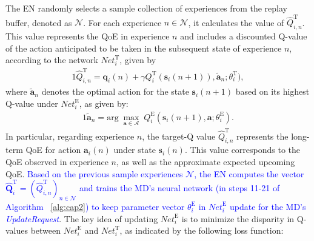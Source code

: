 \documentclass[10pt, journal,letterpaper]{IEEEtran}
\begin{document}
The EN randomly selects a sample collection of experiences from the replay buffer, denoted as $\mathcal{N}$. For each experience $n \in \mathcal{N}$, it calculates the value of $	\hat{Q}^{\text{T}}_{i,n}$. This value represents the QoE in experience $n$ and includes a discounted Q-value of the action anticipated to be taken in the subsequent state of experience $n$, according to the network $\textit{Net}^\text{T}_i$, given by
\begin{alignat}{1}
	\hat{Q}_{i,n}^{\text{T}} = \boldsymbol{q}_i(n) + \gamma Q_i^{\text{T}}(\boldsymbol{s}_i(n+1)), \tilde{\boldsymbol{a}}_n; \theta_i^{\text{T}}),
	\label{28}  
\end{alignat}  
where $\tilde{\boldsymbol{a}}_n$ denotes the optimal action for the state $\boldsymbol{s}_i(n+1)$ based on its highest Q-value under $\textit{Net}_i^{\text{E}}$, as given by:
\begin{alignat}{1}
	\tilde{\boldsymbol{a}}_n = \text{arg} \; \max_{\boldsymbol{a} \in \mathcal{A}} \; Q_i^{\text{E}}(\boldsymbol{s}_i(n+1), \boldsymbol{a}; \theta_i^{\text{E}}).
	\label{29}  
\end{alignat} 
In particular, regarding experience $n$, the target-Q value $\hat{Q}_{i,n}^{\text{T}}$ represents the long-term QoE for action $\boldsymbol{a}_i(n)$ under state $\boldsymbol{s}_i(n)$. This value corresponds to the QoE observed in experience $n$, as well as the approximate expected upcoming QoE. %
\textcolor{blue}{Based on the previous sample experiences $\mathcal{N}$, the EN computes the vector $\hat{\mathbf{Q}}_i^{\text{T}} = (\hat{Q}^{\text{T}}_{i,n})_{n \in \mathcal{N}}$ and trains the MD's neural network (in steps 11-21 of Algorithm ~\ref{alg:cap2}) to keep parameter vector $\theta^{\text{E}}_i$ in $\textit{Net}_i^{\text{E}}$ update for the MD's \textit{UpdateRequest}}. The key idea of updating $\textit{Net}_i^{\text{E}}$ is to minimize the disparity in Q-values between $\textit{Net}_i^{\text{E}}$ and $\textit{Net}_i^{\text{T}}$, as indicated by the following loss function:
	
\end{document}
